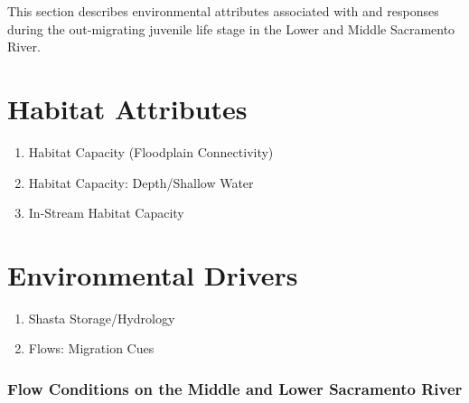 \documentclass[
]{book}
\theoremstyle{definition}
\theoremstyle{definition}
\theoremstyle{definition}
\theoremstyle{definition}
\theoremstyle{remark}
\begin{document}
This section describes environmental attributes associated with and responses during the out-migrating juvenile life stage in the Lower and Middle Sacramento River.

\hypertarget{habitat-attributes-3}{%
\section{Habitat Attributes}\label{habitat-attributes-3}}

\begin{enumerate}
\def\labelenumi{\arabic{enumi}.}
\item
  Habitat Capacity (Floodplain Connectivity)
\item
  Habitat Capacity: Depth/Shallow Water
\item
  In-Stream Habitat Capacity
\end{enumerate}

\hypertarget{environmental-drivers-2}{%
\section{Environmental Drivers}\label{environmental-drivers-2}}

\begin{enumerate}
\def\labelenumi{\arabic{enumi}.}
\item
  Shasta Storage/Hydrology
\item
  Flows: Migration Cues
\end{enumerate}

\hypertarget{flow-conditions-on-the-middle-and-lower-sacramento-river}{%
\subsubsection{Flow Conditions on the Middle and Lower Sacramento River}\label{flow-conditions-on-the-middle-and-lower-sacramento-river}}
\end{document}
